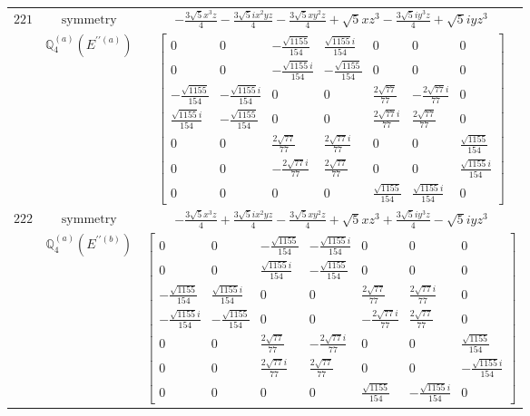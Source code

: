 \documentclass[fleqn,8pt,landscape]{jsarticle}
\begin{document}
\begin{longtable}{ccc}
$ 221 $ & $ \text{symmetry} $ & $ - \frac{3 \sqrt{5} x^{3} z}{4} - \frac{3 \sqrt{5} i x^{2} y z}{4} - \frac{3 \sqrt{5} x y^{2} z}{4} + \sqrt{5} x z^{3} - \frac{3 \sqrt{5} i y^{3} z}{4} + \sqrt{5} i y z^{3} $ \\
$  $ & $ \mathbb{Q}_{4}^{(a)}(E^{\prime\prime(a)}) $ & $ \begin{bmatrix} 0 & 0 & - \frac{\sqrt{1155}}{154} & \frac{\sqrt{1155} i}{154} & 0 & 0 & 0 \\ 0 & 0 & - \frac{\sqrt{1155} i}{154} & - \frac{\sqrt{1155}}{154} & 0 & 0 & 0 \\ - \frac{\sqrt{1155}}{154} & - \frac{\sqrt{1155} i}{154} & 0 & 0 & \frac{2 \sqrt{77}}{77} & - \frac{2 \sqrt{77} i}{77} & 0 \\ \frac{\sqrt{1155} i}{154} & - \frac{\sqrt{1155}}{154} & 0 & 0 & \frac{2 \sqrt{77} i}{77} & \frac{2 \sqrt{77}}{77} & 0 \\ 0 & 0 & \frac{2 \sqrt{77}}{77} & \frac{2 \sqrt{77} i}{77} & 0 & 0 & \frac{\sqrt{1155}}{154} \\ 0 & 0 & - \frac{2 \sqrt{77} i}{77} & \frac{2 \sqrt{77}}{77} & 0 & 0 & \frac{\sqrt{1155} i}{154} \\ 0 & 0 & 0 & 0 & \frac{\sqrt{1155}}{154} & \frac{\sqrt{1155} i}{154} & 0 \end{bmatrix} $ \\ \hline
$ 222 $ & $ \text{symmetry} $ & $ - \frac{3 \sqrt{5} x^{3} z}{4} + \frac{3 \sqrt{5} i x^{2} y z}{4} - \frac{3 \sqrt{5} x y^{2} z}{4} + \sqrt{5} x z^{3} + \frac{3 \sqrt{5} i y^{3} z}{4} - \sqrt{5} i y z^{3} $ \\
$  $ & $ \mathbb{Q}_{4}^{(a)}(E^{\prime\prime(b)}) $ & $ \begin{bmatrix} 0 & 0 & - \frac{\sqrt{1155}}{154} & - \frac{\sqrt{1155} i}{154} & 0 & 0 & 0 \\ 0 & 0 & \frac{\sqrt{1155} i}{154} & - \frac{\sqrt{1155}}{154} & 0 & 0 & 0 \\ - \frac{\sqrt{1155}}{154} & \frac{\sqrt{1155} i}{154} & 0 & 0 & \frac{2 \sqrt{77}}{77} & \frac{2 \sqrt{77} i}{77} & 0 \\ - \frac{\sqrt{1155} i}{154} & - \frac{\sqrt{1155}}{154} & 0 & 0 & - \frac{2 \sqrt{77} i}{77} & \frac{2 \sqrt{77}}{77} & 0 \\ 0 & 0 & \frac{2 \sqrt{77}}{77} & - \frac{2 \sqrt{77} i}{77} & 0 & 0 & \frac{\sqrt{1155}}{154} \\ 0 & 0 & \frac{2 \sqrt{77} i}{77} & \frac{2 \sqrt{77}}{77} & 0 & 0 & - \frac{\sqrt{1155} i}{154} \\ 0 & 0 & 0 & 0 & \frac{\sqrt{1155}}{154} & - \frac{\sqrt{1155} i}{154} & 0 \end{bmatrix} $ \\ \hline

\end{longtable}
\end{document}
